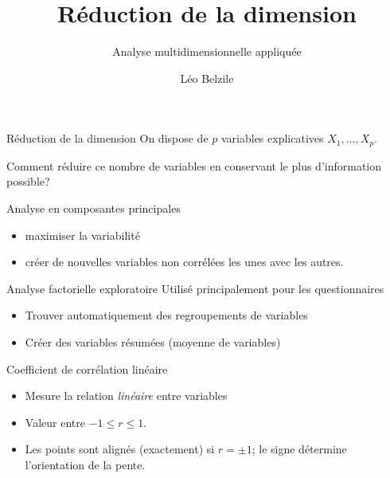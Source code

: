 \documentclass[
  ignorenonframetext,
]{beamer}
\title{Réduction de la dimension}
\subtitle{Analyse multidimensionnelle appliquée}
\author{Léo Belzile}
\date{}
\institute{HEC Montréal}
\providecommand{\tightlist}{%
  \setlength{\itemsep}{0pt}\setlength{\parskip}{0pt}}\usepackage{longtable,booktabs,array}
\begin{document}
\frame{\titlepage}
\ifdefined\Shaded\renewenvironment{Shaded}{\begin{tcolorbox}[boxrule=0pt, borderline west={3pt}{0pt}{shadecolor}, interior hidden, enhanced, sharp corners, frame hidden, breakable]}{\end{tcolorbox}}\fi

\begin{frame}{Réduction de la dimension}
\protect\hypertarget{ruxe9duction-de-la-dimension}{}
On dispose de \(p\) variables explicatives \(X_1, \ldots, X_p\).

Comment réduire ce nombre de variables en conservant le plus
d'information possible?
\end{frame}

\begin{frame}{Analyse en composantes principales}
\protect\hypertarget{analyse-en-composantes-principales}{}
\begin{itemize}
\tightlist
\item
  maximiser la variabilité
\item
  créer de nouvelles variables non corrélées les unes avec les autres.
\end{itemize}
\end{frame}

\begin{frame}{Analyse factorielle exploratoire}
\protect\hypertarget{analyse-factorielle-exploratoire}{}
Utilisé principalement pour les questionnaires

\begin{itemize}
\tightlist
\item
  Trouver automatiquement des regroupements de variables
\item
  Créer des variables résumées (moyenne de variables)
\end{itemize}
\end{frame}

\begin{frame}{Coefficient de corrélation linéaire}
\protect\hypertarget{coefficient-de-corruxe9lation-linuxe9aire}{}
\begin{itemize}
\tightlist
\item
  Mesure la relation \emph{linéaire} entre variables
\item
  Valeur entre \(-1 \leq r \leq 1\).
\item
  Les points sont alignés (exactement) si \(r=\pm 1\); le signe
  détermine l'orientation de la pente.
\end{itemize}
\end{frame}
\end{document}

